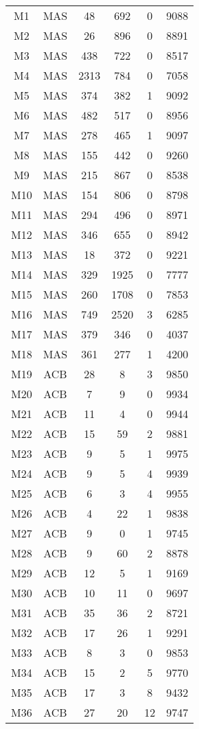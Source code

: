 \begin{center}
\begin{longtable}{cccccc}
\hline \hline
\endlastfoot	
M1	&	MAS	&	48	&	692	&	0	&	9088	\\
M2	&	MAS	&	26	&	896	&	0	&	8891	\\
M3	&	MAS	&	438	&	722	&	0	&	8517	\\
M4	&	MAS	&	2313	&	784	&	0	&	7058	\\
M5	&	MAS	&	374	&	382	&	1	&	9092	\\
M6	&	MAS	&	482	&	517	&	0	&	8956	\\
M7	&	MAS	&	278	&	465	&	1	&	9097	\\
M8	&	MAS	&	155	&	442	&	0	&	9260	\\
M9	&	MAS	&	215	&	867	&	0	&	8538	\\
M10	&	MAS	&	154	&	806	&	0	&	8798	\\
M11	&	MAS	&	294	&	496	&	0	&	8971	\\
M12	&	MAS	&	346	&	655	&	0	&	8942	\\
M13	&	MAS	&	18	&	372	&	0	&	9221	\\
M14	&	MAS	&	329	&	1925	&	0	&	7777	\\
M15	&	MAS	&	260	&	1708	&	0	&	7853	\\
M16	&	MAS	&	749	&	2520	&	3	&	6285	\\
M17	&	MAS	&	379	&	346	&	0	&	4037	\\
M18	&	MAS	&	361	&	277	&	1	&	4200	\\
M19	&	ACB	&	28	&	8	&	3	&	9850	\\
M20	&	ACB	&	7	&	9	&	0	&	9934	\\
M21	&	ACB	&	11	&	4	&	0	&	9944	\\
M22	&	ACB	&	15	&	59	&	2	&	9881	\\
M23	&	ACB	&	9	&	5	&	1	&	9975	\\
M24	&	ACB	&	9	&	5	&	4	&	9939	\\
M25	&	ACB	&	6	&	3	&	4	&	9955	\\
M26	&	ACB	&	4	&	22	&	1	&	9838	\\
M27	&	ACB	&	9	&	0	&	1	&	9745	\\
M28	&	ACB	&	9	&	60	&	2	&	8878	\\
M29	&	ACB	&	12	&	5	&	1	&	9169	\\
M30	&	ACB	&	10	&	11	&	0	&	9697	\\
M31	&	ACB	&	35	&	36	&	2	&	8721	\\
M32	&	ACB	&	17	&	26	&	1	&	9291	\\
M33	&	ACB	&	8	&	3	&	0	&	9853	\\
M34	&	ACB	&	15	&	2	&	5	&	9770	\\
M35	&	ACB	&	17	&	3	&	8	&	9432	\\
M36	&	ACB	&	27	&	20	&	12	&	9747	\\


\end{longtable}    
\end{center}







